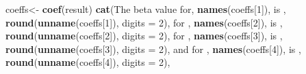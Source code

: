 \documentclass[
]{book}
\newenvironment{Shaded}{\begin{snugshade}}{\end{snugshade}}
\newcommand{\AttributeTok}[1]{\textcolor[rgb]{0.13,0.29,0.53}{#1}}
\newcommand{\DecValTok}[1]{\textcolor[rgb]{0.00,0.00,0.81}{#1}}
\newcommand{\FunctionTok}[1]{\textcolor[rgb]{0.13,0.29,0.53}{\textbf{#1}}}
\newcommand{\NormalTok}[1]{#1}
\newcommand{\OtherTok}[1]{\textcolor[rgb]{0.56,0.35,0.01}{#1}}
\newcommand{\StringTok}[1]{\textcolor[rgb]{0.31,0.60,0.02}{#1}}
\begin{document}
\begin{Shaded}
\begin{Highlighting}[]
\NormalTok{coeffs}\OtherTok{\textless{}{-}} \FunctionTok{coef}\NormalTok{(result)}
\FunctionTok{cat}\NormalTok{(}\StringTok{\textquotesingle{}The beta value for\textquotesingle{}}\NormalTok{, }\FunctionTok{names}\NormalTok{(coeffs[}\DecValTok{1}\NormalTok{]), }\StringTok{\textquotesingle{} is \textquotesingle{}}\NormalTok{, }\FunctionTok{round}\NormalTok{(}\FunctionTok{unname}\NormalTok{(coeffs[}\DecValTok{1}\NormalTok{]), }\AttributeTok{digits =} \DecValTok{2}\NormalTok{), }\StringTok{\textquotesingle{} for \textquotesingle{}}\NormalTok{, }\FunctionTok{names}\NormalTok{(coeffs[}\DecValTok{2}\NormalTok{]), }\StringTok{\textquotesingle{} is \textquotesingle{}}\NormalTok{, }\FunctionTok{round}\NormalTok{(}\FunctionTok{unname}\NormalTok{(coeffs[}\DecValTok{2}\NormalTok{]), }\AttributeTok{digits =} \DecValTok{2}\NormalTok{), }\StringTok{\textquotesingle{} for \textquotesingle{}}\NormalTok{, }\FunctionTok{names}\NormalTok{(coeffs[}\DecValTok{3}\NormalTok{]), }\StringTok{\textquotesingle{} is \textquotesingle{}}\NormalTok{, }\FunctionTok{round}\NormalTok{(}\FunctionTok{unname}\NormalTok{(coeffs[}\DecValTok{3}\NormalTok{]), }\AttributeTok{digits =} \DecValTok{2}\NormalTok{),}\StringTok{\textquotesingle{} and for \textquotesingle{}}\NormalTok{, }\FunctionTok{names}\NormalTok{(coeffs[}\DecValTok{4}\NormalTok{]), }\StringTok{\textquotesingle{} is \textquotesingle{}}\NormalTok{, }\FunctionTok{round}\NormalTok{(}\FunctionTok{unname}\NormalTok{(coeffs[}\DecValTok{4}\NormalTok{]), }\AttributeTok{digits =} \DecValTok{2}\NormalTok{),}
    

\end{Highlighting}
\end{Shaded}
\end{document}
